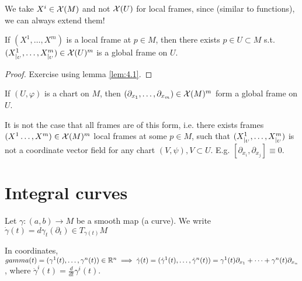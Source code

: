 \begin{remark}
    We take \(X^i\in \mathcal{X}(M)\) and not \(\mathcal{X}(U)\) for local frames, since (similar to functions), we can always extend them!
\end{remark}

\begin{lemma}\label{lem:7.8}
    If \((X^1,\dots,X^m)\) is a local frame at \(p\in M\), then there exists \(p\in U\subset M\) s.t. 
    \((X^1_{|_{U}},\dots,X^m_{|_{U}})\in \mathcal{X}(U)^m\) is a global frame on \(U\).
\end{lemma}
\begin{proof}
    Exercise using lemma \ref{lem:4.1}.
\end{proof}

 If \((U,\varphi)\) is a chart on \(M\), then \((\partial_{x_1},\dots,\partial_{x_m})\in \mathcal{X}(M)^m\) form 
a global frame on \(U\).

\begin{remark}[Warning]
    It is not the case that all frames are of this form, i.e. there exists frames \((X^1\dots,X^m)\in \mathcal{X}(M)^m\) local frames at some 
    \(p\in M\), such that \((X^1_{|_{U}},\dots,X^m_{|_{U}})\) is not a coordinate vector field for any chart \((V,\psi),V\subset U\).
    E.g. \([\partial_{x_i},\partial_{x_j}]\equiv 0.\)

\end{remark}

\section{Integral curves}

Let \(\gamma:(a,b)\to M\) be a smooth map (a curve). We write 
\(\dot{\gamma}(t)=d\gamma_t(\partial_t)\in T_{\gamma(t)}M\)
\begin{center}
\end{center}

In coordinates, \(gamma(t)=(\gamma^1(t),\dots,\gamma^n(t))\in \mathbb{R}^n\implies \dot{\gamma}(t)=(\dot{\gamma}^1(t),\dots,\dot{\gamma}^n(t))=\gamma^1(t)\partial_{x_1}+\dots+\gamma^n(t)\partial_{x_n}\),
where \(\dot{\gamma}^i(t)=\frac{d}{dt}\gamma^i(t)\).

